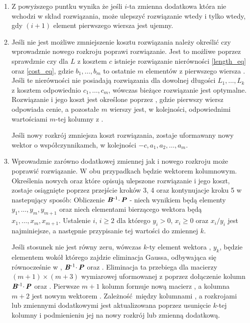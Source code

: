 \begin{enumerate}
\item Z powyższego puntku wynika że jeśli $i$-ta zmienna dodatkowa która nie wchodzi w skład rozwiązania, może ulepszyć rozwiązanie wtedy i tylko wtedy, gdy $(i+1)$ element pierwszego wiersza  jest ujemny.

\item Jeśli nie jest możliwe zmniejszenie kosztu rozwiązania należy określić czy wprowadznie nowego rozkroju poprawi rozwiązanie. Jest to możliwe poprzez sprawdznie czy dla $L$ z kosztem $c$ istnieje rozwiązanie nierówności \ref{length_eq} oraz \ref{cost_eq}, gdzie $b_1,\dots,b_m$ to ostatnie $m$ elementów z pierwszego wiersza . Jeśli te nierówności nie posiadają rozwiązania dla dowolnej długości $L_1,\dots,L_k$ z kosztem odpowiednio $c_1,\dots,c_m$, wówczas bieżące rozwiązanie jest optymalne. Rozwiązanie i jego koszt jest określone poprzez , gdzie pierwszy wiersz odpowiada cenie, a pozostałe $m$ wierszy jest, w kolejności, odpowiednimi wartościami $m$-tej kolumny z .

Jeśli nowy rozkrój zmniejsza koszt rozwiązania, zostaje uformawany nowy wektor  o współczynnikamch, w kolejności $-c,a_1,a_2,\dots,a_m$.

\item Wprowadznie zarówno dodatkowej zmiennej jak i nowego rozkroju może poprawić rozwiązanie. W obu przypadkach  będzie wektorem kolumnowym. Określenia nowych  oraz  które opisują ulepszone rozwiązanie i jego koszt, zostaje osiągnięte poprzez przejście kroków 3, 4 oraz kontynujacje kroku 5 w nastepujący sposób: Obliczenie $\textbf{\textit{B}}\textsuperscript{-1} \cdotp \textbf{\textit{P}}$ - niech wynikiem będą elementy $y_1,\dots,y_m,y_{m+1}$ oraz niech elementami bierzącego wektora  będą $x_1,\dots,x_m,x_{m+1}$. Ustalenie $i$, $ i \ge 2$ dla którego $y_i > 0$, $x_i \ge 0$ oraz $x_i/y_i$ jest najminiejsze, a następnie przypisanie tej wartości do zmiennej $k$.

Jeśli stosunek nie jest równy zeru, wówczas $k$-ty element wektora , $y_k$, będzie elementem wokół którego zajdzie eliminacja Gaussa, odbywająca się równocześnie w , $\textbf{\textit{B}}\textsuperscript{-1} \cdotp \textbf{\textit{P}}$ oraz . Eliminacja ta przebiega dla macierzy $(m+1) \times (m+3)$ wymiarowej  uformowanej z  poprzez dołączenie kolumn $\textbf{\textit{B}}\textsuperscript{-1} \cdotp \textbf{\textit{P}}$ oraz . Pierwsze $m+1$ kolumn  formuje nową macierz , a kolumna $m+2$ jest nowym wektorem . Zależność między kolumnami , a rozkrojami lub zmiennymi dodatkowymi jest aktualizowana poprzez usunięcie $k$-tej kolumny i podmienieniu jej na nowy rozkrój lub zmienną dodatkową.

\end{enumerate}

